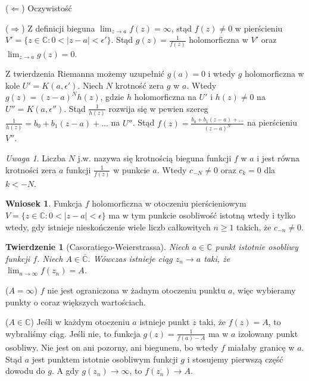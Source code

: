\documentclass[11pt]{article}
\newcommand{\abs}[1]{\left|#1\right|} %
\newcommand{\extcomplex}{\overline{\mathbb{C}}} %
\theoremstyle{plain}
\newtheorem*{theorem}{Twierdzenie}
\theoremstyle{definition}
\newtheorem*{corollary}{Wniosek}
\theoremstyle{remark}
\newtheorem*{remark}{Uwaga}
\let\oldendproof\endproof
\renewenvironment{proof}[1][\proofname]{
  \oldproof[\textsc{\small #1}]
}{\oldendproof}
\begin{document}
\begin{proof}
  ($\Leftarrow$) Oczywistość

  ($\Rightarrow$) Z definicji bieguna $ \lim_{z \to a} f(z) = \infty $, stąd $ f(z) \neq 0 $ w pierścieniu $ V' = \{ z \in \mathbb{C}: 0 < \abs{z-a} < \epsilon' \} $.
  Stąd $ g(z) = \frac{1}{f(z)} $ holomorficzna w $ V' $ oraz $ \lim_{z \to a} g(z) = 0 $.

  Z twierdzenia Riemanna możemy uzupełnić $ g(a) = 0 $ i wtedy $ g $ holomorficzna w kole $ U' = K(a, \epsilon') $.
  Niech $ N $ krotność zera $g$ w $a$.
  Wtedy $  g(z) = (z-a)^{N}h(z) $, gdzie $h$ holomorficzna na $ U' $ i $ h(z) \neq 0 $ na $ U'' = K(a, \epsilon'') $.
  Stąd $ \frac{1}{h(z)} $ rozwija się w pewien szereg $ \frac{1}{h(z)} = b_0 + b_1(z-a) + \dots $ na $ U'' $.
  Stąd $ f(z) = \frac{b_0 + b_1(z-a) + \dots}{(z-a)^{N}} $ na pierścieniu $ V'' $.
\end{proof}

\begin{remark}
  Liczba $ N $ j.w. nazywa się krotnością bieguna funkcji $f$ w $a$ i jest równa krotności zera $a$ funkcji $ \frac{1}{f(z)} $ w punkcie $ a $.
  Wtedy $ c_{-N} \neq 0 $ oraz $c_k = 0$ dla $ k < -N $.
\end{remark}

\begin{corollary}
  Funkcja $f$ holomorficzna w otoczeniu pierścieniowym $ V = \{ z \in \mathbb{C}: 0 < \abs{z-a} < \epsilon \} $ ma w tym punkcie osobliwość istotną wtedy i tylko wtedy,
  gdy istnieje nieskończenie wiele liczb całkowitych $ n \geq 1 $ takich, że $ c_{-n} \neq 0 $.
\end{corollary}

\begin{theorem}[Casoratiego-Weierstrassa]
  Niech $ a\in \mathbb{C} $ punkt istotnie osobliwy funkcji $ f $.
  Niech $ A \in \extcomplex $.
  Wówczas istnieje ciąg $ z_n \to a $ taki, że $ \lim_{n \to \infty} f(z_n) = A $.
\end{theorem}

\begin{proof}
  ($ A = \infty $) $f$ nie jest ograniczona w żadnym otoczeniu punktu $a$, więc wybieramy punkty o coraz większych wartościach.

  ($ A \in \mathbb{C} $) Jeśli w każdym otoczeniu $a$ istnieje punkt $ z $ taki, że $ f(z) = A $, to wybraliśmy ciąg.
  Jeśli nie, to funkcja $ g(z) = \frac{1}{f(a) - A} $ ma w $ a $ izolowany punkt osobliwy.
  Nie jest on ani pozorny, ani biegunem, bo wtedy $f$ miałaby granicę w $a$.
  Stąd $a$ jest punktem istotnie osobliwym funkcji $g$ i stosujemy pierwszą część dowodu do $g$.
  A gdy $ g(z_n) \to \infty $, to $ f(z_n) \to A $.
\end{proof}
\end{document}
